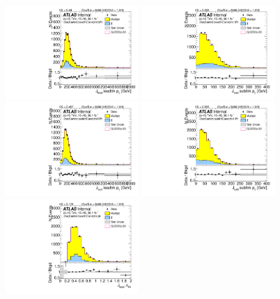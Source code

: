 \begin{figure}[htbp!]
\begin{center}
\includegraphics[angle=270, width=0.45\textwidth]{./figures/boosted/Control/b77_TwoTag_split_Control_leadHCand_trk0_Pt.pdf}
\includegraphics[angle=270, width=0.45\textwidth]{./figures/boosted/Control/b77_TwoTag_split_Control_leadHCand_trk1_Pt.pdf}\\
\includegraphics[angle=270, width=0.45\textwidth]{./figures/boosted/Control/b77_TwoTag_split_Control_sublHCand_trk0_Pt.pdf}
\includegraphics[angle=270, width=0.45\textwidth]{./figures/boosted/Control/b77_TwoTag_split_Control_sublHCand_trk1_Pt.pdf}\\
\includegraphics[angle=270, width=0.45\textwidth]{./figures/boosted/Control/b77_TwoTag_split_Control_leadHCand_trk_dr.pdf}

\end{center}
\end{figure}
